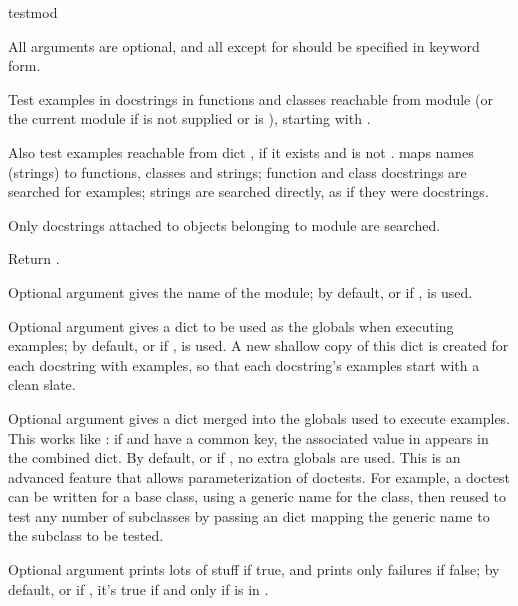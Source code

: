 \begin{funcdesc}{testmod}{}

  All arguments are optional, and all except for  should be
  specified in keyword form.

  Test examples in docstrings in functions and classes reachable
  from module  (or the current module if  is not supplied
  or is ), starting with .

  Also test examples reachable from dict , if it
  exists and is not .   maps
  names (strings) to functions, classes and strings; function and class
  docstrings are searched for examples; strings are searched directly,
  as if they were docstrings.

  Only docstrings attached to objects belonging to module  are
  searched.

  Return .

  Optional argument  gives the name of the module; by default,
  or if ,  is used.

  Optional argument  gives a dict to be used as the globals
  when executing examples; by default, or if ,
   is used.  A new shallow copy of this dict is
  created for each docstring with examples, so that each docstring's
  examples start with a clean slate.

  Optional argument  gives a dict merged into the
  globals used to execute examples.  This works like
  :  if  and  have a
  common key, the associated value in  appears in the
  combined dict.  By default, or if , no extra globals are
  used.  This is an advanced feature that allows parameterization of
  doctests.  For example, a doctest can be written for a base class, using
  a generic name for the class, then reused to test any number of
  subclasses by passing an  dict mapping the generic
  name to the subclass to be tested.

  Optional argument  prints lots of stuff if true, and prints
  only failures if false; by default, or if , it's true
  if and only if  is in .


\end{funcdesc}

